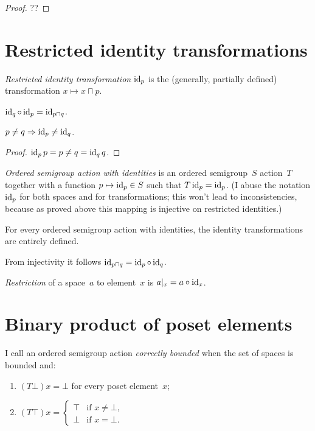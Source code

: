 
\begin{proof}
??
\end{proof}

\section{Restricted identity transformations}

\emph{Restricted identity transformation} $\operatorname{id}_p$ is the (generally, partially defined) transformation $x\mapsto x\sqcap p$.

\begin{obvious}
$\operatorname{id}_q\circ\operatorname{id}_p = \operatorname{id}_{p\sqcap q}$.
\end{obvious}

\begin{prop}
$p\ne q\Rightarrow\operatorname{id}_p\ne\operatorname{id}_q$.
\end{prop}

\begin{proof}
$\operatorname{id}_p p=p \ne q = \operatorname{id}_q q$.
\end{proof}

\emph{Ordered semigroup action with identities} is an ordered semigroup~$S$ action~$T$ together with a function $p\mapsto\operatorname{id}_p\in S$ such that $T\operatorname{id}_p=\operatorname{id}_p$. (I abuse the notation $\operatorname{id}_p$ for both spaces and for transformations; this won't lead to inconsistencies, because as proved above this mapping is injective on restricted identities.)

\begin{obvious}
For every ordered semigroup action with identities, the identity transformations are entirely defined.
\end{obvious}

From injectivity it follows $\operatorname{id}_{p\sqcap q} = \operatorname{id}_p\circ\operatorname{id}_q$.

\emph{Restriction} of a space~$a$ to element~$x$ is $a|_x=a\circ\operatorname{id}_x$.

\section{Binary product of poset elements}

\begin{defn}
I call an ordered semigroup action \emph{correctly bounded} when the set of spaces is bounded and:
\begin{enumerate}
\item $(T\bot)x = \bot$ for every poset element~$x$;
\item $(T\top)x =
\left\{\begin{array}{ll}\top&\text{if }x\ne\bot,\\\bot&\text{if }x=\bot.\end{array}\right.$
\end{enumerate}
\end{defn}

